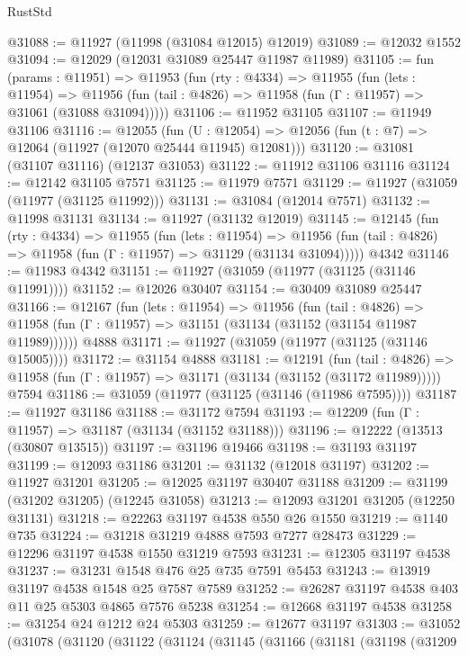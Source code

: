 \begin{lexlean}{RustStd}
\begin{coremodule}
@31088 := @11927 (@11998 (@31084 @12015) @12019)
@31089 := @12032 @1552
@31094 := @12029 (@12031 @31089 @25447 @11987 @11989)
@31105 := fun (params : @11951) =>
  @11953
    (fun (rty : @4334) =>
    @11955
      (fun (lets : @11954) =>
      @11956 (fun (tail : @4826) => @11958 (fun (Γ : @11957) => @31061 (@31088 @31094)))))
@31106 := @11952 @31105
@31107 := @11949 @31106
@31116 := @12055
    (fun (U : @12054) => @12056 (fun (t : @7) => @12064 (@11927 (@12070 @25444 @11945) @12081)))
@31120 := @31081 (@31107 @31116) (@12137 @31053)
@31122 := @11912 @31106 @31116
@31124 := @12142 @31105 @7571
@31125 := @11979 @7571
@31129 := @11927 (@31059 (@11977 (@31125 @11992)))
@31131 := @31084 (@12014 @7571)
@31132 := @11998 @31131
@31134 := @11927 (@31132 @12019)
@31145 := @12145
    (fun (rty : @4334) =>
    @11955
      (fun (lets : @11954) =>
      @11956 (fun (tail : @4826) => @11958 (fun (Γ : @11957) => @31129 (@31134 @31094)))))
    @4342
@31146 := @11983 @4342
@31151 := @11927 (@31059 (@11977 (@31125 (@31146 @11991))))
@31152 := @12026 @30407
@31154 := @30409 @31089 @25447
@31166 := @12167
    (fun (lets : @11954) =>
    @11956
      (fun (tail : @4826) =>
      @11958 (fun (Γ : @11957) => @31151 (@31134 (@31152 (@31154 @11987 @11989))))))
    @4888
@31171 := @11927 (@31059 (@11977 (@31125 (@31146 @15005))))
@31172 := @31154 @4888
@31181 := @12191
    (fun (tail : @4826) => @11958 (fun (Γ : @11957) => @31171 (@31134 (@31152 (@31172 @11989)))))
    @7594
@31186 := @31059 (@11977 (@31125 (@31146 (@11986 @7595))))
@31187 := @11927 @31186
@31188 := @31172 @7594
@31193 := @12209 (fun (Γ : @11957) => @31187 (@31134 (@31152 @31188)))
@31196 := @12222 (@13513 (@30807 @13515))
@31197 := @31196 @19466
@31198 := @31193 @31197
@31199 := @12093 @31186
@31201 := @31132 (@12018 @31197)
@31202 := @11927 @31201
@31205 := @12025 @31197 @30407 @31188
@31209 := @31199 (@31202 @31205) (@12245 @31058)
@31213 := @12093 @31201 @31205 (@12250 @31131)
@31218 := @22263 @31197 @4538 @550 @26 @1550
@31219 := @1140 @735
@31224 := @31218 @31219 @4888 @7593 @7277 @28473
@31229 := @12296 @31197 @4538 @1550 @31219 @7593
@31231 := @12305 @31197 @4538
@31237 := @31231 @1548 @476 @25 @735 @7591 @5453
@31243 := @13919 @31197 @4538 @1548 @25 @7587 @7589
@31252 := @26287 @31197 @4538 @403 @11 @25 @5303 @4865 @7576 @5238
@31254 := @12668 @31197 @4538
@31258 := @31254 @24 @1212 @24 @5303
@31259 := @12677 @31197
@31303 := @31052
    (@31078
      (@31120
        (@31122
          (@31124
            (@31145
              (@31166
                (@31181
                  (@31198
                    (@31209

\end{coremodule}
\end{lexlean}
